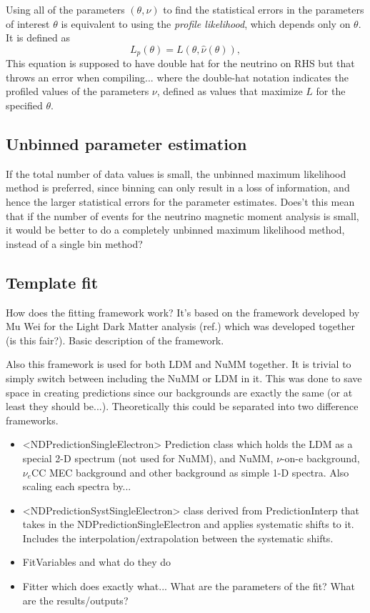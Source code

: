 Using all of the parameters $\left(\theta,\nu\right)$  to find the statistical errors in the parameters of interest $\theta$ is equivalent to using the \textit{profile likelihood}, which depends only on $\theta$. It is defined as
\begin{equation}
L_p\left(\theta\right)=L\left(\theta,\hat{\nu}\left(\theta\right)\right),
\end{equation}
This equation is supposed to have double hat for the neutrino on RHS but that throws an error when compiling...
where the double-hat notation indicates the profiled values of the parameters $\nu$, defined as values that maximize $L$ for the specified $\theta$.

\subsection{Unbinned parameter estimation}
If the total number of data values is small, the unbinned maximum likelihood method is preferred, since binning can only result in a loss of information, and hence the larger statistical errors for the parameter estimates.
Does't this mean that if the number of events for the neutrino magnetic moment analysis is small, it would be better to do a completely unbinned maximum likelihood method, instead of a single bin method?

\subsection{Template fit}
How does the fitting framework work? It's based on the framework developed by Mu Wei for the Light Dark Matter analysis (ref.) which was developed together (is this fair?). Basic description of the framework.

Also this framework is used for both LDM and NuMM together. It is trivial to simply switch between including the NuMM or LDM in it. This was done to save space in creating predictions since our backgrounds are exactly the same (or at least they should be...). Theoretically this could be separated into two difference frameworks.

\begin{itemize}
\item <NDPredictionSingleElectron> Prediction class which holds the LDM as a special 2-D spectrum (not used for NuMM), and NuMM, $\nu$-on-e background, $\nu_e$CC MEC background and other background as simple 1-D spectra. Also scaling each spectra by...
\item <NDPredictionSystSingleElectron> class derived from PredictionInterp that takes in the NDPredictionSingleElectron and applies systematic shifts to it. Includes the interpolation/extrapolation between the systematic shifts.
\item FitVariables and what do they do
\item Fitter which does exactly what... What are the parameters of the fit? What are the results/outputs?
\end{itemize}
\fi

